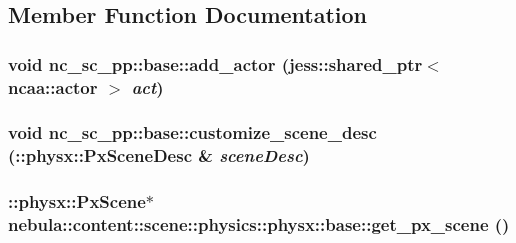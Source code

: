\subsection{Member Function Documentation}
\hypertarget{classnebula_1_1content_1_1scene_1_1physics_1_1physx_1_1base_ab4a8bf780b82fe261cb143431e989299}{
\subsubsection[{add\_\-actor}]{\setlength{\rightskip}{0pt plus 5cm}void nc\_\-sc\_\-pp::base::add\_\-actor (jess::shared\_\-ptr$<$ {\bf ncaa::actor} $>$ {\em act})}}
\label{classnebula_1_1content_1_1scene_1_1physics_1_1physx_1_1base_ab4a8bf780b82fe261cb143431e989299}
\hypertarget{classnebula_1_1content_1_1scene_1_1physics_1_1physx_1_1base_a618ce3799aad85fc3fe0304c8af9a236}{
\subsubsection[{customize\_\-scene\_\-desc}]{\setlength{\rightskip}{0pt plus 5cm}void nc\_\-sc\_\-pp::base::customize\_\-scene\_\-desc (::physx::PxSceneDesc \& {\em sceneDesc})}}
\label{classnebula_1_1content_1_1scene_1_1physics_1_1physx_1_1base_a618ce3799aad85fc3fe0304c8af9a236}
\hypertarget{classnebula_1_1content_1_1scene_1_1physics_1_1physx_1_1base_a9b165825bcc08fc22cd44914f10fce09}{
\subsubsection[{get\_\-px\_\-scene}]{\setlength{\rightskip}{0pt plus 5cm}::physx::PxScene$\ast$ nebula::content::scene::physics::physx::base::get\_\-px\_\-scene ()}}
\label{classnebula_1_1content_1_1scene_1_1physics_1_1physx_1_1base_a9b165825bcc08fc22cd44914f10fce09}
